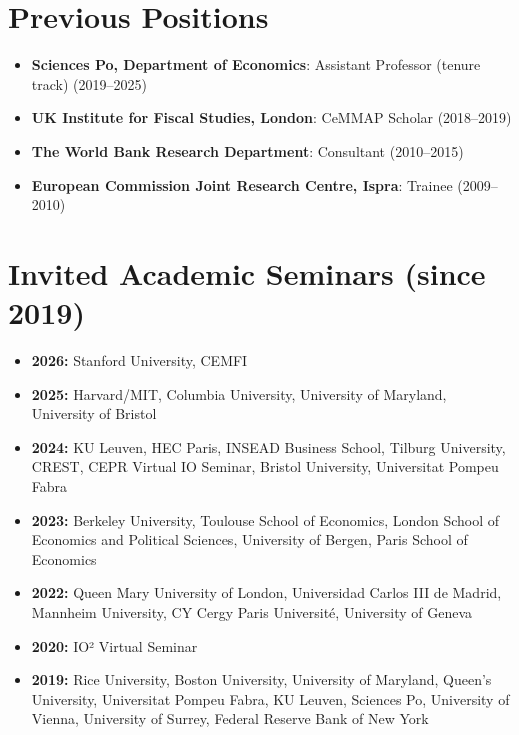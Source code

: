 \documentclass[11pt,a4paper]{article}
\begin{document}
\section*{Previous Positions}
\begin{itemize}
\renewcommand{\labelitemi}{\fontsize{4}{4}\selectfont$\blacksquare$}
\item \textbf{Sciences Po, Department of Economics}: Assistant Professor (tenure track) (2019--2025) \vspace{0.1cm}
\item \textbf{UK Institute for Fiscal Studies, London}: CeMMAP Scholar (2018--2019) \vspace{0.1cm}
\item \textbf{The World Bank Research Department}: Consultant (2010--2015) \vspace{0.1cm}
\item \textbf{European Commission Joint Research Centre, Ispra}: Trainee (2009--2010) \vspace{0.1cm}
\end{itemize}


\section*{Invited Academic Seminars (since 2019)}
\begin{itemize}
\renewcommand{\labelitemi}{\fontsize{4}{4}\selectfont$\blacksquare$}
\item \textbf{2026:} Stanford University, CEMFI \vspace{0.15cm}
\item \textbf{2025:} Harvard/MIT, Columbia University, University of Maryland, University of Bristol \vspace{0.15cm}
\item \textbf{2024:} KU Leuven, HEC Paris, INSEAD Business School, Tilburg University, CREST, CEPR Virtual IO Seminar, Bristol University, Universitat Pompeu Fabra \vspace{0.15cm}
\item \textbf{2023:} Berkeley University, Toulouse School of Economics, London School of Economics and Political Sciences, University of Bergen, Paris School of Economics \vspace{0.15cm}
\item \textbf{2022:} Queen Mary University of London, Universidad Carlos III de Madrid, Mannheim University, CY Cergy Paris Université, University of Geneva \vspace{0.15cm}
\item \textbf{2020:} IO² Virtual Seminar \vspace{0.15cm}
\item \textbf{2019:} Rice University, Boston University, University of Maryland, Queen's University, Universitat Pompeu Fabra, KU Leuven, Sciences Po, University of Vienna, University of Surrey, Federal Reserve Bank of New York \vspace{0.15cm}
\end{itemize}
\end{document}

